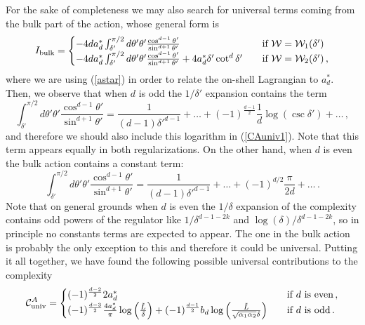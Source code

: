 \documentclass[11pt,letterpaper]{article}
\begin{document}
For the sake of completeness we may also search for universal terms coming from the bulk part of the action, whose general form is
\begin{equation}
I_{\rm bulk}=
\begin{cases}
-4da^*_d\int_{\delta'}^{\pi/2}d\theta'\theta'\frac{\cos^{d-1}\theta'}{\sin^{d+1}\theta'}\quad &\text{if}\,\, \mathcal{W}=\mathcal{W}_1(\delta')\\
-4da^*_d\int_{\delta'}^{\pi/2}d\theta'\theta'\frac{\cos^{d-1}\theta'}{\sin^{d+1}\theta'}+4a^*_d \delta' \cot^d\delta' \quad &\text{if}\,\, \mathcal{W}=\mathcal{W}_2(\delta')\, ,
\end{cases}
\end{equation}
where we are using (\ref{astar}) in order to relate the on-shell Lagrangian to $a^*_d$.
Then, we observe that when $d$ is odd the $1/\delta'$ expansion contains the term
\begin{equation}\label{logbulk}
\int_{\delta'}^{\pi/2}d\theta'\theta'\frac{\cos^{d-1}\theta'}{\sin^{d+1}\theta'}=\frac{1}{(d-1)\delta'^{d-1}}+\ldots+(-1)^{\frac{d-1}{2}}\frac{1}{d}\log\left(\csc\delta'\right)+\ldots\, ,
\end{equation}
and therefore we should also include this logarithm in (\ref{CAuniv1}). Note that this term appears equally in both regularizations. On the other hand, when $d$ is even the bulk action contains a constant term:
\begin{equation}
\int_{\delta'}^{\pi/2}d\theta'\theta'\frac{\cos^{d-1}\theta'}{\sin^{d+1}\theta'}=\frac{1}{(d-1)\delta'^{d-1}}+\ldots+(-1)^{d/2}\frac{\pi}{2d}+\ldots\, .
\end{equation}
Note that on general grounds when $d$ is even the $1/\delta$ expansion of the complexity contains odd powers of the regulator like $1/\delta^{d-1-2k}$ and $\log(\delta)/\delta^{d-1-2k}$, so in principle no constants terms are expected to appear. The one in the bulk action is probably the only exception to this and therefore it could be universal. Putting it all together, we have found the following possible universal contributions to the complexity
\begin{equation}\label{CAuniv2}
\mathcal{C}^A_{\rm univ}=
\begin{cases}
(-1)^{\frac{d-2}{2}}2 a_d^*\quad &\text{if $d$ is even}\, ,\\
(-1)^{\frac{d-3}{2}}\frac{4a_d^*}{\pi}\log\left(\frac{\tilde L}{\delta}\right)+(-1)^{\frac{d-1}{2}}b_d \log\left(\frac{\tilde L}{\sqrt{\alpha_1\alpha_2}\delta}\right)\quad &\text{if $d$ is odd}\, .
\end{cases}
\end{equation}
\end{document}
